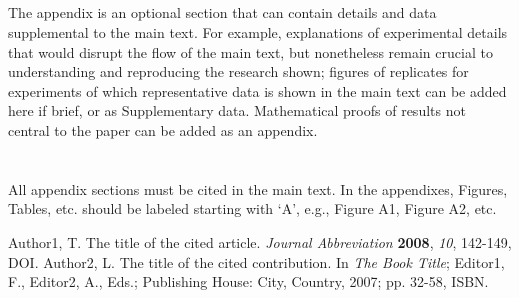 \documentclass[journal,article,submit,moreauthors,pdftex,10pt,a4paper]{mdpi}
\begin{document}
\subsection{}
The appendix is an optional section that can contain details and data supplemental to the main text. For example, explanations of experimental details that would disrupt the flow of the main text, but nonetheless remain crucial to understanding and reproducing the research shown; figures of replicates for experiments of which representative data is shown in the main text can be added here if brief, or as Supplementary data. Mathematical proofs of results not central to the paper can be added as an appendix.

\section{}
All appendix sections must be cited in the main text. In the appendixes, Figures, Tables, etc. should be labeled starting with `A', e.g., Figure A1, Figure A2, etc. 


\begin{thebibliography}{999}
Author1, T. The title of the cited article. {\em Journal Abbreviation} {\bf 2008}, {\em 10}, 142-149, DOI.
Author2, L. The title of the cited contribution. In {\em The Book Title}; Editor1, F., Editor2, A., Eds.; Publishing House: City, Country, 2007; pp. 32-58, ISBN.
\end{thebibliography}


%


\end{document}
